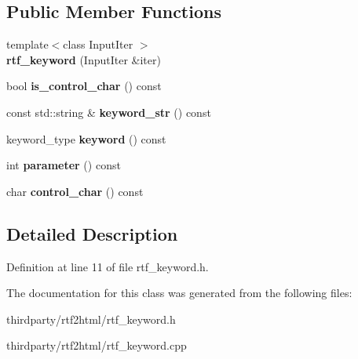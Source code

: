 \subsection*{Public Member Functions}
\begin{DoxyCompactItemize}
\item 
\mbox{\label{classrtf__keyword_aef5a888bb9a59b9eef4bcb607a716336}} 
{\footnotesize template$<$class Input\+Iter $>$ }\\{\bfseries rtf\+\_\+keyword} (Input\+Iter \&iter)
\item 
\mbox{\label{classrtf__keyword_a5c662ae7e44f5737221cb117cbb2584e}} 
bool {\bfseries is\+\_\+control\+\_\+char} () const
\item 
\mbox{\label{classrtf__keyword_a68643d392f8b375d3ac3351ec25b7da2}} 
const std\+::string \& {\bfseries keyword\+\_\+str} () const
\item 
\mbox{\label{classrtf__keyword_ae6b83e911c35bf3c6b79948eca886f6f}} 
keyword\+\_\+type {\bfseries keyword} () const
\item 
\mbox{\label{classrtf__keyword_a1fa9f56797775d36b1dc35dcdfc00a40}} 
int {\bfseries parameter} () const
\item 
\mbox{\label{classrtf__keyword_a7efcfa412e1bb6266ef1a6841802c14f}} 
char {\bfseries control\+\_\+char} () const
\end{DoxyCompactItemize}


\subsection{Detailed Description}


Definition at line 11 of file rtf\+\_\+keyword.\+h.



The documentation for this class was generated from the following files\+:\begin{DoxyCompactItemize}
\item 
thirdparty/rtf2html/rtf\+\_\+keyword.\+h\item 
thirdparty/rtf2html/rtf\+\_\+keyword.\+cpp\end{DoxyCompactItemize}
